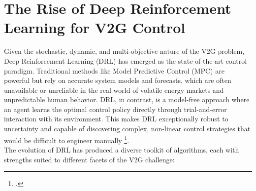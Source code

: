 \section{The Rise of Deep Reinforcement Learning for V2G Control}
Given the stochastic, dynamic, and multi-objective nature of the V2G problem, Deep Reinforcement Learning (DRL) has emerged as the state-of-the-art control paradigm. Traditional methods like Model Predictive Control (MPC) are powerful but rely on accurate system models and forecasts, which are often unavailable or unreliable in the real world of volatile energy markets and unpredictable human behavior. DRL, in contrast, is a model-free approach where an agent learns the optimal control policy directly through trial-and-error interaction with its environment. This makes DRL exceptionally robust to uncertainty and capable of discovering complex, non-linear control strategies that would be difficult to engineer manually \footcite{orfanoudakis2022deep, alfaverh2022optima, kumar2024deep}.
\\
The evolution of DRL has produced a diverse toolkit of algorithms, each with strengths suited to different facets of the V2G challenge:
